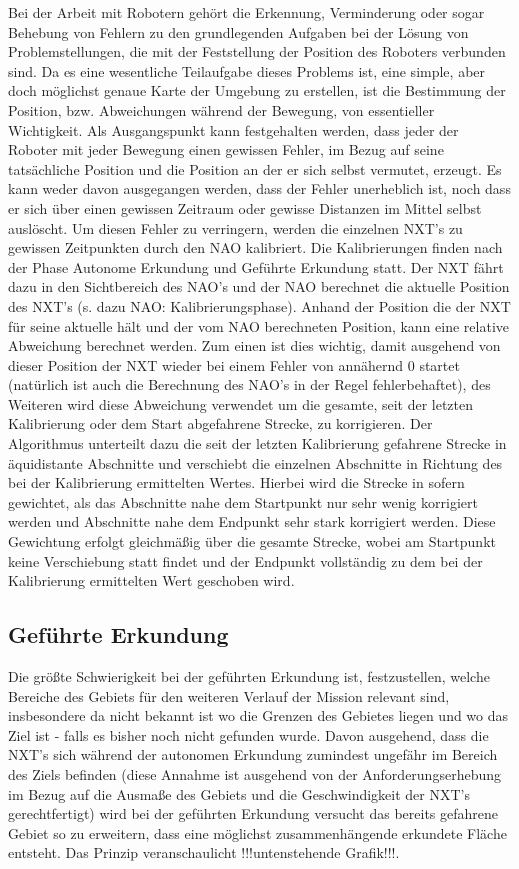 Bei der Arbeit mit Robotern gehört die Erkennung, Verminderung oder sogar Behebung von Fehlern zu den grundlegenden Aufgaben bei der Lösung von Problemstellungen, die mit der Feststellung der Position des Roboters verbunden sind. Da es eine wesentliche Teilaufgabe dieses Problems ist, eine simple, aber doch möglichst genaue Karte der Umgebung zu erstellen, ist die Bestimmung der Position, bzw. Abweichungen während der Bewegung, von essentieller Wichtigkeit.
Als Ausgangspunkt kann festgehalten werden, dass jeder der Roboter mit jeder Bewegung einen gewissen Fehler, im Bezug auf seine tatsächliche Position und die Position an der er sich selbst vermutet, erzeugt. Es kann weder davon ausgegangen werden, dass der Fehler unerheblich ist, noch dass er sich über einen gewissen Zeitraum oder gewisse Distanzen im Mittel selbst auslöscht. Um diesen Fehler zu verringern, werden die einzelnen NXT's zu gewissen Zeitpunkten durch den NAO kalibriert. Die Kalibrierungen finden nach der Phase Autonome Erkundung und Geführte Erkundung statt. Der NXT fährt dazu in den Sichtbereich des NAO's und der NAO berechnet die aktuelle Position des NXT's (s. dazu NAO: Kalibrierungsphase). Anhand der Position die der NXT für seine aktuelle hält und der vom NAO berechneten Position, kann eine relative Abweichung berechnet werden. Zum einen ist dies wichtig, damit ausgehend von dieser Position der NXT wieder bei einem Fehler von annähernd 0 startet (natürlich ist auch die Berechnung des NAO's in der Regel fehlerbehaftet), des Weiteren wird diese Abweichung verwendet um die gesamte, seit der letzten Kalibrierung oder dem Start abgefahrene Strecke, zu korrigieren. Der Algorithmus unterteilt dazu die seit der letzten Kalibrierung gefahrene Strecke in äquidistante Abschnitte und verschiebt die einzelnen Abschnitte in Richtung des bei der Kalibrierung ermittelten Wertes. Hierbei wird die Strecke in sofern gewichtet, als das Abschnitte nahe dem Startpunkt nur sehr wenig korrigiert werden und Abschnitte nahe dem Endpunkt sehr stark korrigiert werden. Diese Gewichtung erfolgt gleichmäßig über die gesamte Strecke, wobei am Startpunkt keine Verschiebung statt findet und der Endpunkt vollständig zu dem bei der Kalibrierung ermittelten Wert geschoben wird.

\subsection{Geführte Erkundung}

Die größte Schwierigkeit bei der geführten Erkundung ist, festzustellen, welche Bereiche des Gebiets für den weiteren Verlauf der Mission relevant sind, insbesondere da nicht bekannt ist wo die Grenzen des Gebietes liegen und wo das Ziel ist - falls es bisher noch nicht gefunden wurde. Davon ausgehend, dass die NXT's sich während der autonomen Erkundung zumindest ungefähr im Bereich des Ziels befinden (diese Annahme ist ausgehend von der Anforderungserhebung im Bezug auf die Ausmaße des Gebiets und die Geschwindigkeit der NXT's gerechtfertigt) wird bei der geführten Erkundung versucht das bereits gefahrene Gebiet so zu erweitern, dass eine möglichst zusammenhängende erkundete Fläche entsteht. Das Prinzip veranschaulicht !!!untenstehende Grafik!!!.

